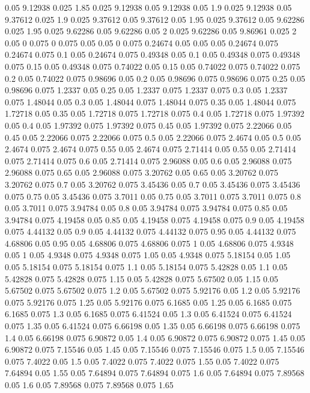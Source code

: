 0.05 9.12938
0.025 1.85
0.025 9.12938
0.05 9.12938
0.05 1.9
0.025 9.12938
0.05 9.37612
0.025 1.9
0.025 9.37612
0.05 9.37612
0.05 1.95
0.025 9.37612
0.05 9.62286
0.025 1.95
0.025 9.62286
0.05 9.62286
0.05 2
0.025 9.62286
0.05 9.86961
0.025 2
0.05 0
0.075 0
0.075 0.05
0.05 0
0.075 0.24674
0.05 0.05
0.05 0.24674
0.075 0.24674
0.075 0.1
0.05 0.24674
0.075 0.49348
0.05 0.1
0.05 0.49348
0.075 0.49348
0.075 0.15
0.05 0.49348
0.075 0.74022
0.05 0.15
0.05 0.74022
0.075 0.74022
0.075 0.2
0.05 0.74022
0.075 0.98696
0.05 0.2
0.05 0.98696
0.075 0.98696
0.075 0.25
0.05 0.98696
0.075 1.2337
0.05 0.25
0.05 1.2337
0.075 1.2337
0.075 0.3
0.05 1.2337
0.075 1.48044
0.05 0.3
0.05 1.48044
0.075 1.48044
0.075 0.35
0.05 1.48044
0.075 1.72718
0.05 0.35
0.05 1.72718
0.075 1.72718
0.075 0.4
0.05 1.72718
0.075 1.97392
0.05 0.4
0.05 1.97392
0.075 1.97392
0.075 0.45
0.05 1.97392
0.075 2.22066
0.05 0.45
0.05 2.22066
0.075 2.22066
0.075 0.5
0.05 2.22066
0.075 2.4674
0.05 0.5
0.05 2.4674
0.075 2.4674
0.075 0.55
0.05 2.4674
0.075 2.71414
0.05 0.55
0.05 2.71414
0.075 2.71414
0.075 0.6
0.05 2.71414
0.075 2.96088
0.05 0.6
0.05 2.96088
0.075 2.96088
0.075 0.65
0.05 2.96088
0.075 3.20762
0.05 0.65
0.05 3.20762
0.075 3.20762
0.075 0.7
0.05 3.20762
0.075 3.45436
0.05 0.7
0.05 3.45436
0.075 3.45436
0.075 0.75
0.05 3.45436
0.075 3.7011
0.05 0.75
0.05 3.7011
0.075 3.7011
0.075 0.8
0.05 3.7011
0.075 3.94784
0.05 0.8
0.05 3.94784
0.075 3.94784
0.075 0.85
0.05 3.94784
0.075 4.19458
0.05 0.85
0.05 4.19458
0.075 4.19458
0.075 0.9
0.05 4.19458
0.075 4.44132
0.05 0.9
0.05 4.44132
0.075 4.44132
0.075 0.95
0.05 4.44132
0.075 4.68806
0.05 0.95
0.05 4.68806
0.075 4.68806
0.075 1
0.05 4.68806
0.075 4.9348
0.05 1
0.05 4.9348
0.075 4.9348
0.075 1.05
0.05 4.9348
0.075 5.18154
0.05 1.05
0.05 5.18154
0.075 5.18154
0.075 1.1
0.05 5.18154
0.075 5.42828
0.05 1.1
0.05 5.42828
0.075 5.42828
0.075 1.15
0.05 5.42828
0.075 5.67502
0.05 1.15
0.05 5.67502
0.075 5.67502
0.075 1.2
0.05 5.67502
0.075 5.92176
0.05 1.2
0.05 5.92176
0.075 5.92176
0.075 1.25
0.05 5.92176
0.075 6.1685
0.05 1.25
0.05 6.1685
0.075 6.1685
0.075 1.3
0.05 6.1685
0.075 6.41524
0.05 1.3
0.05 6.41524
0.075 6.41524
0.075 1.35
0.05 6.41524
0.075 6.66198
0.05 1.35
0.05 6.66198
0.075 6.66198
0.075 1.4
0.05 6.66198
0.075 6.90872
0.05 1.4
0.05 6.90872
0.075 6.90872
0.075 1.45
0.05 6.90872
0.075 7.15546
0.05 1.45
0.05 7.15546
0.075 7.15546
0.075 1.5
0.05 7.15546
0.075 7.4022
0.05 1.5
0.05 7.4022
0.075 7.4022
0.075 1.55
0.05 7.4022
0.075 7.64894
0.05 1.55
0.05 7.64894
0.075 7.64894
0.075 1.6
0.05 7.64894
0.075 7.89568
0.05 1.6
0.05 7.89568
0.075 7.89568
0.075 1.65
